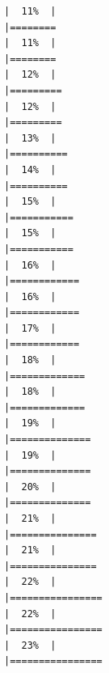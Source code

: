 \documentclass[
  english,
  man,a4paper,mask,floatsintext]{apa6}
\begin{document}
\begin{verbatim}
|  11%  |                                                                              |========                                                              |  11%  |                                                                              |========                                                              |  12%  |                                                                              |=========                                                             |  12%  |                                                                              |=========                                                             |  13%  |                                                                              |==========                                                            |  14%  |                                                                              |==========                                                            |  15%  |                                                                              |===========                                                           |  15%  |                                                                              |===========                                                           |  16%  |                                                                              |============                                                          |  16%  |                                                                              |============                                                          |  17%  |                                                                              |============                                                          |  18%  |                                                                              |=============                                                         |  18%  |                                                                              |=============                                                         |  19%  |                                                                              |==============                                                        |  19%  |                                                                              |==============                                                        |  20%  |                                                                              |==============                                                        |  21%  |                                                                              |===============                                                       |  21%  |                                                                              |===============                                                       |  22%  |                                                                              |================                                                      |  22%  |                                                                              |================                                                      |  23%  |                                                                              |================                                                      
\end{verbatim}
\end{document}
